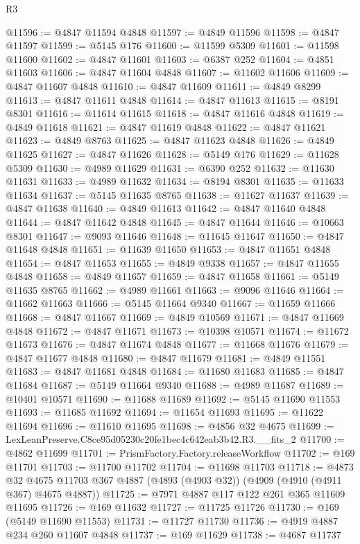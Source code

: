 \begin{lexlean}{R3}
\begin{coremodule}
@11596 := @4847 @11594 @4848
@11597 := @4849 @11596
@11598 := @4847 @11597
@11599 := @5145 @176
@11600 := @11599 @5309
@11601 := @11598 @11600
@11602 := @4847 @11601
@11603 := @6387 @252
@11604 := @4851 @11603
@11606 := @4847 @11604 @4848
@11607 := @11602 @11606
@11609 := @4847 @11607 @4848
@11610 := @4847 @11609
@11611 := @4849 @8299
@11613 := @4847 @11611 @4848
@11614 := @4847 @11613
@11615 := @8191 @8301
@11616 := @11614 @11615
@11618 := @4847 @11616 @4848
@11619 := @4849 @11618
@11621 := @4847 @11619 @4848
@11622 := @4847 @11621
@11623 := @4849 @8763
@11625 := @4847 @11623 @4848
@11626 := @4849 @11625
@11627 := @4847 @11626
@11628 := @5149 @176
@11629 := @11628 @5309
@11630 := @4989 @11629
@11631 := @6390 @252
@11632 := @11630 @11631
@11633 := @4989 @11632
@11634 := @8194 @8301
@11635 := @11633 @11634
@11637 := @5145 @11635 @8765
@11638 := @11627 @11637
@11639 := @4847 @11638
@11640 := @4849 @11613
@11642 := @4847 @11640 @4848
@11644 := @4847 @11642 @4848
@11645 := @4847 @11644
@11646 := @10663 @8301
@11647 := @9093 @11646
@11648 := @11645 @11647
@11650 := @4847 @11648 @4848
@11651 := @11639 @11650
@11653 := @4847 @11651 @4848
@11654 := @4847 @11653
@11655 := @4849 @9338
@11657 := @4847 @11655 @4848
@11658 := @4849 @11657
@11659 := @4847 @11658
@11661 := @5149 @11635 @8765
@11662 := @4989 @11661
@11663 := @9096 @11646
@11664 := @11662 @11663
@11666 := @5145 @11664 @9340
@11667 := @11659 @11666
@11668 := @4847 @11667
@11669 := @4849 @10569
@11671 := @4847 @11669 @4848
@11672 := @4847 @11671
@11673 := @10398 @10571
@11674 := @11672 @11673
@11676 := @4847 @11674 @4848
@11677 := @11668 @11676
@11679 := @4847 @11677 @4848
@11680 := @4847 @11679
@11681 := @4849 @11551
@11683 := @4847 @11681 @4848
@11684 := @11680 @11683
@11685 := @4847 @11684
@11687 := @5149 @11664 @9340
@11688 := @4989 @11687
@11689 := @10401 @10571
@11690 := @11688 @11689
@11692 := @5145 @11690 @11553
@11693 := @11685 @11692
@11694 := @11654 @11693
@11695 := @11622 @11694
@11696 := @11610 @11695
@11698 := @4856 @32 @4675
@11699 := LexLeanPreserve.C8ce95d05230c20fe1bec4c642eab3b42.R3.__fits_2
@11700 := @4862 @11699
@11701 := PrismFactory.Factory.releaseWorkflow
@11702 := @169 @11701
@11703 := @11700 @11702
@11704 := @11698 @11703
@11718 := @4873
    @32
    @4675
    @11703
    @367
    @4887
    (@4893 (@4903 @32))
    (@4909 (@4910 (@4911 @367) @4675 @4887))
@11725 := @7971 @4887 @117 @122 @261 @365 @11609 @11695
@11726 := @169 @11632
@11727 := @11725 @11726
@11730 := @169 (@5149 @11690 @11553)
@11731 := @11727 @11730
@11736 := @4919 @4887 @234 @260 @11607 @4848
@11737 := @169 @11629
@11738 := @4687 @11737

\end{coremodule}
\end{lexlean}
